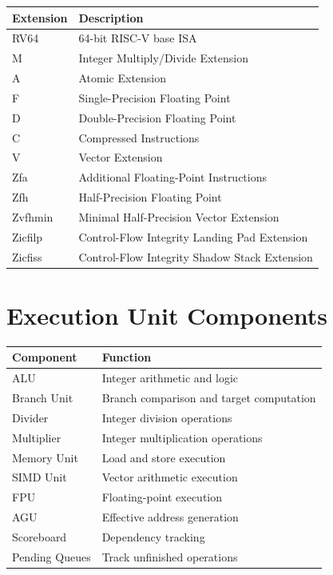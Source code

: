 \begin{center}
\renewcommand{\arraystretch}{1.3}
\begin{tabular}{@{}ll@{}}
\toprule
\textbf{Extension} & \textbf{Description} \\
\midrule
RV64 & 64-bit RISC-V base ISA \\
M & Integer Multiply/Divide Extension \\
A & Atomic Extension \\
F & Single-Precision Floating Point \\
D & Double-Precision Floating Point \\
C & Compressed Instructions \\
V & Vector Extension \\
Zfa & Additional Floating-Point Instructions \\
Zfh & Half-Precision Floating Point \\
Zvfhmin & Minimal Half-Precision Vector Extension \\
Zicfilp & Control-Flow Integrity Landing Pad Extension \\
Zicfiss & Control-Flow Integrity Shadow Stack Extension \\
\bottomrule
\end{tabular}
\end{center}

\chapter{Execution Unit Components}

\begin{center}
\renewcommand{\arraystretch}{1.3}
\begin{tabular}{@{}ll@{}}
\toprule
\textbf{Component} & \textbf{Function} \\
\midrule
ALU & Integer arithmetic and logic \\
Branch Unit & Branch comparison and target computation \\
Divider & Integer division operations \\
Multiplier & Integer multiplication operations \\
Memory Unit & Load and store execution \\
SIMD Unit & Vector arithmetic execution \\
FPU & Floating-point execution \\
AGU & Effective address generation \\
Scoreboard & Dependency tracking \\
Pending Queues & Track unfinished operations \\
\bottomrule
\end{tabular}
\end{center}
